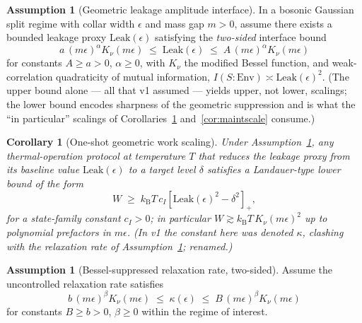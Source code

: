 \documentclass[11pt,a4paper]{article}
\theoremstyle{plain}
\newtheorem{corollary}[theorem]{Corollary}
\theoremstyle{definition}
\newtheorem{assumption}[theorem]{Assumption}
\theoremstyle{remark}
\newcommand{\kB}{k_{\mathrm{B}}}
\begin{document}
\begin{assumption}[Geometric leakage amplitude interface]\label{ass:leak}
In a bosonic Gaussian split regime with collar width $\epsilon$ and mass gap
$m > 0$, assume there exists a bounded leakage proxy
$\mathrm{Leak}(\epsilon)$ satisfying the \emph{two-sided} interface bound
\begin{equation}
a\,(m\epsilon)^\alpha K_\nu(m\epsilon) \;\le\; \mathrm{Leak}(\epsilon)
\;\le\; A\,(m\epsilon)^\alpha K_\nu(m\epsilon)
\end{equation}
for constants $A \ge a > 0$, $\alpha \ge 0$, with $K_\nu$ the modified Bessel
function, and weak-correlation quadraticity of mutual information,
$I(S : \mathrm{Env}) \asymp \mathrm{Leak}(\epsilon)^2$. (The upper bound alone
--- all that v1 assumed --- yields upper, not lower, scalings; the lower bound
encodes sharpness of the geometric suppression and is what the ``in
particular'' scalings of Corollaries~\ref{cor:oneshot}
and~\ref{cor:maintscale} consume.)
\end{assumption}

\begin{corollary}[One-shot geometric work scaling]\label{cor:oneshot}
Under Assumption~\ref{ass:leak}, any thermal-operation protocol at temperature
$T$ that reduces the leakage proxy from its baseline value
$\mathrm{Leak}(\epsilon)$ to a target level $\delta$ satisfies a Landauer-type
lower bound of the form
\begin{equation}
W \;\ge\; \kB T\, c_I \left[\mathrm{Leak}(\epsilon)^2 - \delta^2\right]_+,
\end{equation}
for a state-family constant $c_I > 0$; in particular
$W \gtrsim \kB T\, K_\nu(m\epsilon)^2$ up to polynomial prefactors in
$m\epsilon$. (In v1 the constant here was denoted $\kappa$, clashing with the
relaxation rate of Assumption~\ref{ass:rate}; renamed.)
\end{corollary}

\begin{assumption}[Bessel-suppressed relaxation rate, two-sided]\label{ass:rate}
Assume the uncontrolled relaxation rate satisfies
\begin{equation}
b\,(m\epsilon)^\beta K_\nu(m\epsilon) \;\le\; \kappa(\epsilon)
\;\le\; B\,(m\epsilon)^\beta K_\nu(m\epsilon)
\end{equation}
for constants $B \ge b > 0$, $\beta \ge 0$ within the regime of interest.
\end{assumption}
\end{document}
